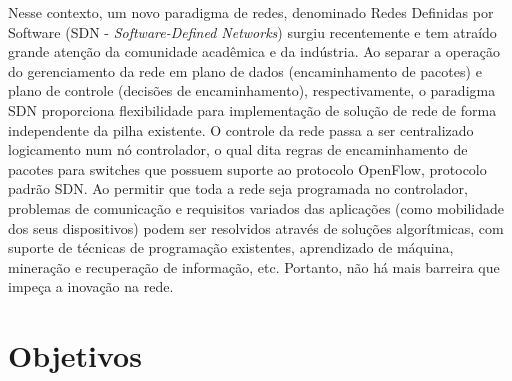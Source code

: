 \documentclass[	12pt, Times, openright, twoside, a4paper, english, brazil]{abntex2}
\begin{document}
Nesse contexto, um novo paradigma de redes, denominado Redes Definidas por Software (SDN - \textit{Software-Defined Networks}) surgiu recentemente e tem atraído grande atenção da comunidade acadêmica e da indústria. Ao separar a operação do gerenciamento da rede em plano de dados (encaminhamento de pacotes) e plano de controle (decisões de encaminhamento), respectivamente, o paradigma SDN proporciona flexibilidade para implementação de solução de rede de forma independente da pilha existente. O controle da rede passa a ser centralizado logicamento num nó controlador, o qual dita regras de encaminhamento de pacotes para switches que possuem suporte ao protocolo OpenFlow, protocolo padrão SDN. Ao permitir que toda a rede seja programada no controlador, problemas de comunicação e requisitos variados das aplicações (como mobilidade dos seus dispositivos) podem ser resolvidos através de soluções algorítmicas, com suporte de técnicas de programação existentes, aprendizado de máquina, mineração e recuperação de informação, etc. Portanto, não há mais barreira que impeça a inovação na rede.


\section{Objetivos}
\end{document}

